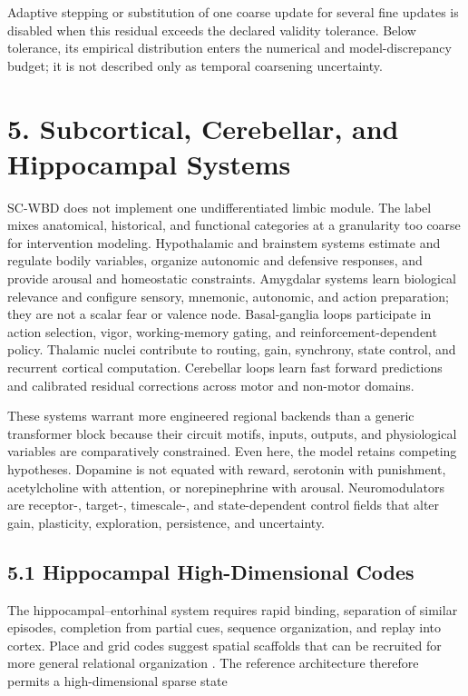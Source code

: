 Adaptive stepping or substitution of one coarse update for several fine
updates is disabled when this residual exceeds the declared validity
tolerance. Below tolerance, its empirical distribution enters the numerical
and model-discrepancy budget; it is not described only as temporal
coarsening uncertainty.

\section{5. Subcortical, Cerebellar, and Hippocampal Systems}

SC-WBD does not implement one undifferentiated limbic module. The label mixes
anatomical, historical, and functional categories at a granularity too coarse
for intervention modeling. Hypothalamic and brainstem systems estimate and
regulate bodily variables, organize autonomic and defensive responses, and
provide arousal and homeostatic constraints. Amygdalar systems learn
biological relevance and configure sensory, mnemonic, autonomic, and action
preparation; they are not a scalar fear or valence node. Basal-ganglia loops
participate in action selection, vigor, working-memory gating, and
reinforcement-dependent policy. Thalamic nuclei contribute to routing, gain,
synchrony, state control, and recurrent cortical computation. Cerebellar loops
learn fast forward predictions and calibrated residual corrections across
motor and non-motor domains.

These systems warrant more engineered regional backends than a generic
transformer block because their circuit motifs, inputs, outputs, and
physiological variables are comparatively constrained. Even here, the model
retains competing hypotheses. Dopamine is not equated with reward, serotonin
with punishment, acetylcholine with attention, or norepinephrine with arousal.
Neuromodulators are receptor-, target-, timescale-, and state-dependent control
fields that alter gain, plasticity, exploration, persistence, and uncertainty.

\subsection{5.1 Hippocampal High-Dimensional Codes}

The hippocampal--entorhinal system requires rapid binding, separation of
similar episodes, completion from partial cues, sequence organization, and
replay into cortex. Place and grid codes suggest spatial scaffolds that can be
recruited for more general relational organization \citep{moser2015}. The
reference architecture therefore permits a high-dimensional sparse state

